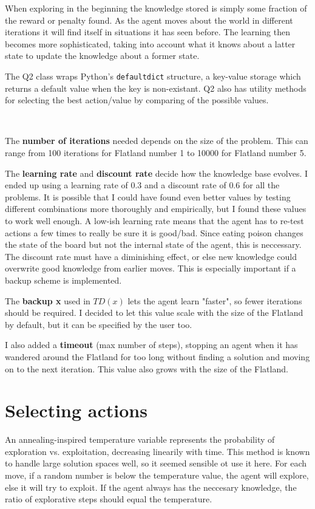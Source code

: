 When exploring in the beginning the knowledge stored is simply some fraction of the reward or penalty found.
As the agent moves about the world in different iterations it will find itself in situations it has seen before.
The learning then becomes more sophisticated,
taking into account what it knows about a latter state to update the knowledge about a former state.

The Q2 class wraps Python's \texttt{defaultdict} structure,
a key-value storage which returns a default value when the key is non-existant.
Q2 also has utility methods for selecting the best action/value by comparing of the possible values.

~

The \textbf{number of iterations} needed depends on the size of the problem.
This can range from 100 iterations for Flatland number 1 to 10000 for Flatland number 5.

The \textbf{learning rate} and \textbf{discount rate} decide how the knowledge base evolves.
I ended up using a learning rate of $0.3$ and a discount rate of $0.6$ for all the problems.
It is possible that I could have found even better values by testing different combinations more thoroughly and empirically,
but I found these values to work well enough.
A low-ish learning rate means that the agent has to re-test actions a few times to really be sure it is good/bad.
Since eating poison changes the state of the board but not the internal state of the agent,
this is neccessary.
The discount rate must have a diminishing effect,
or else new knowledge could overwrite good knowledge from earlier moves.
This is especially important if a backup scheme is implemented.

The \textbf{backup x} used in $TD(x)$ lets the agent learn "faster", so fewer iterations should be required.
I decided to let this value scale with the size of the Flatland by default,
but it can be specified by the user too.

I also added a \textbf{timeout} (max number of steps),
stopping an agent when it has wandered around the Flatland for too long without finding a solution
and moving on to the next iteration.
This value also grows with the size of the Flatland.

\section*{Selecting actions}
An annealing-inspired temperature variable represents the probability of exploration vs. exploitation,
decreasing linearily with time.
This method is known to handle large solution spaces well,
so it seemed sensible ot use it here.
For each move,
if a random number is below the temperature value, the agent will explore, else it will try to exploit.
If the agent always has the neccesary knowledge,
the ratio of explorative steps should equal the temperature.

